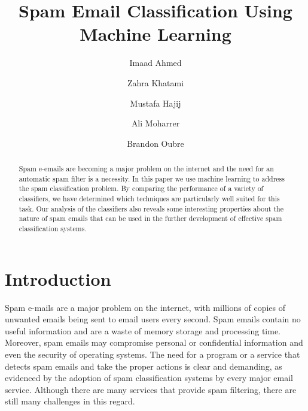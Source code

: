 \documentclass[11pt,oneside,reqno]{amsart}
\theoremstyle{definition}
\theoremstyle{definition}
\theoremstyle{remark}
\numberwithin{equation}{section}
\numberwithin{equation}{section}
\begin{document}
\raggedbottom

\title{Spam Email Classification Using Machine Learning}

\author{Imaad Ahmed}
\address{Department of Computer Science, Louisiana State University, 
Baton Rouge, LA 70803 USA}
\author{Zahra Khatami}
\address{Department of Electrical Engineering, Louisiana State University, 
Baton Rouge, LA 70803 USA}
\author{Mustafa Hajij}
\address{Department of Mathematics, Louisiana State University, 
Baton Rouge, LA 70803 USA}

\author{Ali Moharrer}
\address{Department of Electrical Engineering, Louisiana State University, 
Baton Rouge, LA 70803 USA}
\author{Brandon Oubre}
\address{Department of Computer Science, Louisiana State University, 
Baton Rouge, LA 70803 USA}


\begin{abstract}
Spam e-emails are becoming a major problem on the internet and the need for an automatic spam filter is a necessity. In this paper we use machine learning to address the spam classification problem. By comparing the performance of a variety of classifiers, we have determined which techniques are particularly well suited for this task. Our analysis of the classifiers also reveals some interesting properties about the nature of spam emails that can be used in the further development of effective spam classification systems. 
\end{abstract}


\keywords{} 

\maketitle

\thispagestyle{fancy} %

\section{Introduction}
Spam e-mails are a major problem on the internet, with millions of copies of unwanted emails being sent to email users every second. Spam emails contain no useful information and are a waste of memory storage and processing time. Moreover, spam emails may compromise personal or confidential information and even the security of operating systems. The need for a program or a service that detects spam emails and take the proper actions is clear and demanding, as evidenced by the adoption of spam classification systems by every major email service. Although there are many services that provide spam filtering, there are still many challenges in this regard.
\end{document}
